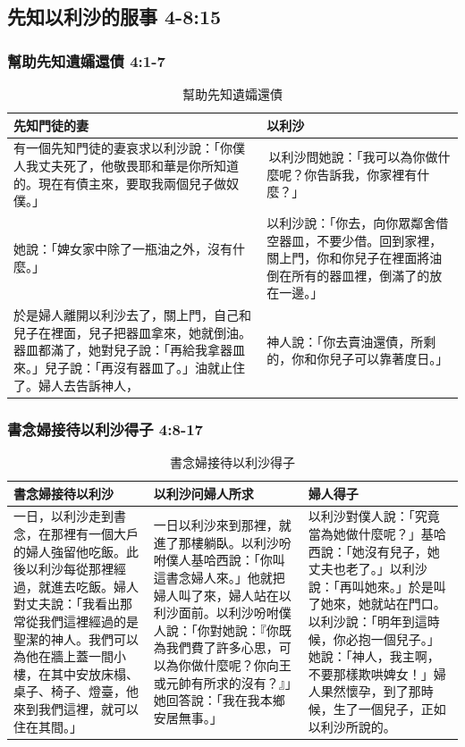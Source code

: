 \subsection{先知以利沙的服事 4-8:15}
\subsubsection{幫助先知遺孀還債 4:1-7}
\begin{table}[H]
\centering
\begin{tabular}{p{}|p{7.25cm}}\hline\hline
先知門徒的妻&以利沙\\\hline
有一個先知門徒的妻哀求以利沙說：「你僕人我丈夫死了，他敬畏耶和華是你所知道的。現在有債主來，要取我兩個兒子做奴僕。」
& 以利沙問她說：「我可以為你做什麼呢？你告訴我，你家裡有什麼？」\\\hline
她說：「婢女家中除了一瓶油之外，沒有什麼。」&以利沙說：「你去，向你眾鄰舍借空器皿，不要少借。回到家裡，關上門，你和你兒子在裡面將油倒在所有的器皿裡，倒滿了的放在一邊。」\\\hline
於是婦人離開以利沙去了，關上門，自己和兒子在裡面，兒子把器皿拿來，她就倒油。器皿都滿了，她對兒子說：「再給我拿器皿來。」兒子說：「再沒有器皿了。」油就止住了。婦人去告訴神人，&神人說：「你去賣油還債，所剩的，你和你兒子可以靠著度日。」\\\hline
\end{tabular}
\caption{幫助先知遺孀還債}
\end{table}


\subsubsection{書念婦接待以利沙得子 4:8-17}
\begin{table}[H]
\centering
\begin{tabular}{p{5.5cm}|p{5.75cm}|p{}}\hline\hline
書念婦接待以利沙&以利沙问婦人所求&婦人得子\\\hline
一日，以利沙走到書念，在那裡有一個大戶的婦人強留他吃飯。此後以利沙每從那裡經過，就進去吃飯。婦人對丈夫說：「我看出那常從我們這裡經過的是聖潔的神人。我們可以為他在牆上蓋一間小樓，在其中安放床榻、桌子、椅子、燈臺，他來到我們這裡，就可以住在其間。」
&一日以利沙來到那裡，就進了那樓躺臥。以利沙吩咐僕人基哈西說：「你叫這書念婦人來。」他就把婦人叫了來，婦人站在以利沙面前。以利沙吩咐僕人說：「你對她說：『你既為我們費了許多心思，可以為你做什麼呢？你向王或元帥有所求的沒有？』」她回答說：「我在我本鄉安居無事。」
&以利沙對僕人說：「究竟當為她做什麼呢？」基哈西說：「她沒有兒子，她丈夫也老了。」以利沙說：「再叫她來。」於是叫了她來，她就站在門口。以利沙說：「明年到這時候，你必抱一個兒子。」她說：「神人，我主啊，不要那樣欺哄婢女！」婦人果然懷孕，到了那時候，生了一個兒子，正如以利沙所說的。\\\hline
\end{tabular}
\caption{書念婦接待以利沙得子}
\end{table}

